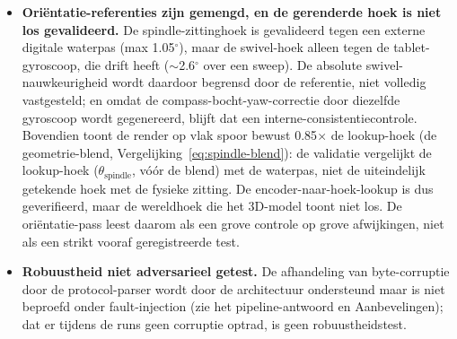 \documentclass[10pt, a4paper, twocolumn]{article}
\begin{document}
\begin{itemize}[leftmargin=*]
    bron bij de huidige segmentresolutie; de overige bronnen worden niet apart
    gemeten.
  \item \textbf{Oriëntatie-referenties zijn gemengd, en de gerenderde hoek is
    niet los gevalideerd.} De spindle-zittinghoek is gevalideerd tegen een externe
    digitale waterpas (max 1.05$^\circ$), maar de swivel-hoek alleen tegen de
    tablet-gyroscoop, die drift heeft ($\sim$2.6$^\circ$ over een sweep). De
    absolute swivel-nauwkeurigheid wordt daardoor begrensd door de referentie, niet
    volledig vastgesteld; en omdat de compass-bocht-yaw-correctie door diezelfde
    gyroscoop wordt gegenereerd, blijft dat een interne-consistentiecontrole.
    Bovendien toont de render op vlak spoor bewust 0.85$\times$ de lookup-hoek (de
    geometrie-blend, Vergelijking~\ref{eq:spindle-blend}): de validatie vergelijkt
    de lookup-hoek ($\theta_{\text{spindle}}$, vóór de blend) met de waterpas, niet
    de uiteindelijk getekende hoek met de fysieke zitting. De
    encoder-naar-hoek-lookup is dus geverifieerd, maar de wereldhoek die het
    3D-model toont niet los. De oriëntatie-pass leest daarom als een grove controle
    op grove afwijkingen, niet als een strikt vooraf geregistreerde test.
  \item \textbf{Robuustheid niet adversarieel getest.} De afhandeling van
    byte-corruptie door de protocol-parser wordt door de architectuur ondersteund
    maar is niet beproefd onder fault-injection (zie het pipeline-antwoord en
    Aanbevelingen); dat er tijdens de runs geen corruptie optrad, is geen
    robuustheidstest.
\end{itemize}
\end{document}
